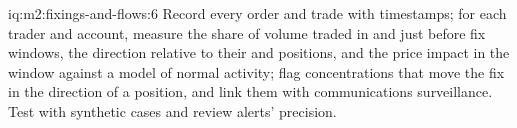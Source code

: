\begin{solution}{iq:m2:fixings-and-flows:6}
Record every order and trade with timestamps; for each trader and account,
measure the share of volume traded in and just before fix windows, the direction
relative to their  and positions, and the price impact in the
window against a model of normal activity; flag concentrations that move the fix
in the direction of a position, and link them with communications surveillance.
Test with synthetic cases and review alerts' precision.
\end{solution}
